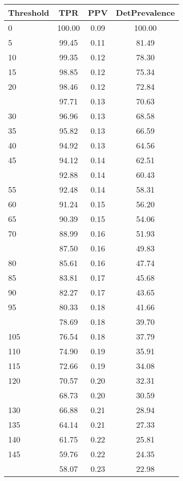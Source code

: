 \begin{table}[ht]
\centering
\begin{tabular}{lccc}
  \toprule
Threshold & TPR & PPV & DetPrevalence \\ 
  \midrule
0 & 100.00 & 0.09 & 100.00 \\ 
  5 & 99.45 & 0.11 & 81.49 \\ 
  10 & 99.35 & 0.12 & 78.30 \\ 
  15 & 98.85 & 0.12 & 75.34 \\ 
  20 & 98.46 & 0.12 & 72.84 \\ 
   \addlinespace
25 & 97.71 & 0.13 & 70.63 \\ 
  30 & 96.96 & 0.13 & 68.58 \\ 
  35 & 95.82 & 0.13 & 66.59 \\ 
  40 & 94.92 & 0.13 & 64.56 \\ 
  45 & 94.12 & 0.14 & 62.51 \\ 
   \addlinespace
50 & 92.88 & 0.14 & 60.43 \\ 
  55 & 92.48 & 0.14 & 58.31 \\ 
  60 & 91.24 & 0.15 & 56.20 \\ 
  65 & 90.39 & 0.15 & 54.06 \\ 
  70 & 88.99 & 0.16 & 51.93 \\ 
   \addlinespace
75 & 87.50 & 0.16 & 49.83 \\ 
  80 & 85.61 & 0.16 & 47.74 \\ 
  85 & 83.81 & 0.17 & 45.68 \\ 
  90 & 82.27 & 0.17 & 43.65 \\ 
  95 & 80.33 & 0.18 & 41.66 \\ 
   \addlinespace
100 & 78.69 & 0.18 & 39.70 \\ 
  105 & 76.54 & 0.18 & 37.79 \\ 
  110 & 74.90 & 0.19 & 35.91 \\ 
  115 & 72.66 & 0.19 & 34.08 \\ 
  120 & 70.57 & 0.20 & 32.31 \\ 
   \addlinespace
125 & 68.73 & 0.20 & 30.59 \\ 
  130 & 66.88 & 0.21 & 28.94 \\ 
  135 & 64.14 & 0.21 & 27.33 \\ 
  140 & 61.75 & 0.22 & 25.81 \\ 
  145 & 59.76 & 0.22 & 24.35 \\ 
   \addlinespace
150 & 58.07 & 0.23 & 22.98 \\ 

\end{tabular}
\end{table}
